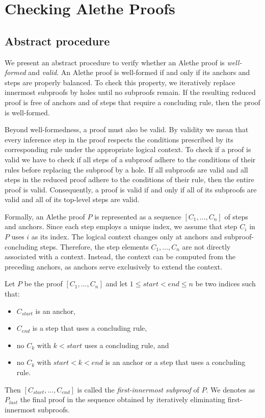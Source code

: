 \section{Checking Alethe Proofs}
\label{sec:checking-alethe-proofs}

\subsection{Abstract procedure}

We present an abstract procedure to verify whether an Alethe proof is \emph{well-formed} and \emph{valid}.
An Alethe proof is well-formed if and only if its anchors and steps are properly balanced.
To check this property, we iteratively replace innermost subproofs by holes until no subproofs remain.
If the resulting reduced proof is free of anchors and of steps that require a concluding rule, then the proof is well-formed.


Beyond well-formedness, a proof must also be valid.
By validity we mean that every inference step in the proof respects the conditions prescribed by its corresponding rule under the appropriate logical context.
To check if a proof is valid we have to check if all steps of a subproof adhere to the conditions of their rules before replacing the subproof by a hole.
If all subproofs are valid and all steps in the reduced proof adhere to the conditions of their rule, then the entire proof is valid.
Consequently, a proof is valid if and only if all of its subproofs are valid and all of its top-level steps are valid.

Formally, an Alethe proof $P$ is represented as a sequence $[C_1, \ldots, C_n]$ of steps and anchors.
Since each step employs a unique index, we assume that step $C_i$ in $P$ uses
$i$ as its index. The logical context changes only at anchors and subproof-concluding
steps. Therefore, the step elements $C_1, \ldots, C_n$ are not directly associated
with a context. Instead, the context can be computed from the preceding anchors,
as anchors serve exclusively to extend the context.


\begin{definition}\label{def:first-innermost}
Let $P$ be the proof $[C_1, \ldots, C_n]$ and let $1 \leq \mathit{start} < \mathit{end} \leq n$ be two indices such
that:
\begin{itemize}
\item $C_{\mathit{start}}$ is an anchor,
\item $C_{\mathit{end}}$ is a step that uses a concluding rule,
\item no $C_k$ with $k < \mathit{start}$ uses a concluding rule, and
\item no $C_k$ with $\mathit{start} < k < \mathit{end}$ is an anchor or a step that uses a concluding rule.
\end{itemize}
Then $[C_{\mathit{start}}, \ldots, C_{\mathit{end}}]$ is called the \emph{first-innermost subproof} of $P$.
We denotes as $P_{last}$ the final proof in the sequence obtained by iteratively eliminating first-innermost subproofs.
\end{definition}

